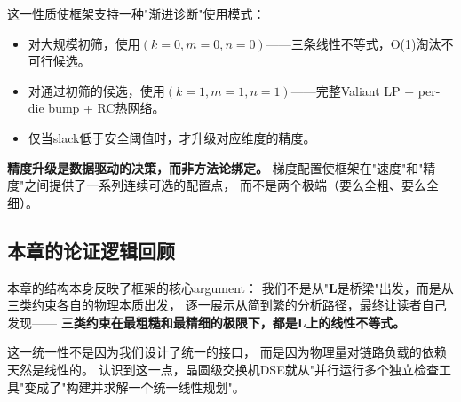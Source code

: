 这一性质使框架支持一种"渐进诊断"使用模式：
\begin{itemize}
    \item 对大规模初筛，使用$(k=0, m=0, n=0)$——三条线性不等式，O(1)淘汰不可行候选。
    \item 对通过初筛的候选，使用$(k=1, m=1, n=1)$——完整Valiant LP + per-die bump + RC热网络。
    \item 仅当slack低于安全阈值时，才升级对应维度的精度。
\end{itemize}

\textbf{精度升级是数据驱动的决策，而非方法论绑定。}
梯度配置使框架在"速度"和"精度"之间提供了一系列连续可选的配置点，
而不是两个极端（要么全粗、要么全细）。

\subsection{本章的论证逻辑回顾}

本章的结构本身反映了框架的核心argument：
我们不是从"$\mathbf{L}$是桥梁"出发，而是从三类约束各自的物理本质出发，
逐一展示从简到繁的分析路径，最终让读者自己发现——
\textbf{三类约束在最粗糙和最精细的极限下，都是$\mathbf{L}$上的线性不等式。}

这一统一性不是因为我们设计了统一的接口，
而是因为物理量对链路负载的依赖天然是线性的。
认识到这一点，晶圆级交换机DSE就从"并行运行多个独立检查工具"变成了"构建并求解一个统一线性规划"。
